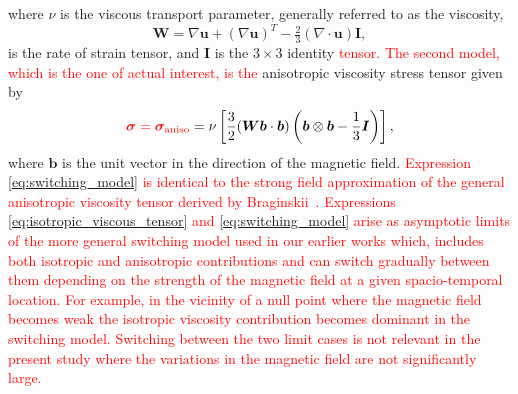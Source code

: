 \documentclass[12pt]{article}
\newcommand{\rs}[2]{\textcolor{red}{#2}}
\newcommand{\ten}[1]{{\bm #1}}
\renewcommand{\vec}[1]{{\bm #1}}
\begin{document}
where $\nu$ is the viscous transport parameter, generally referred to as the viscosity,
\begin{equation}
  \label{eq:rate_of_strain}
  \ten{W} = \nabla\vec{u} + (\nabla\vec{u})^T - \tfrac{2}{3}(\nabla \cdot \vec{u})\ten{I},
\end{equation}
is the rate of strain tensor, and $\ten{I}$ is the  $3\times 3$
identity \rs{}{tensor. The second model, which is the one of actual interest, is the} anisotropic viscosity stress
tensor given by
\begin{equation}
  \label{eq:switching_model}
\rs{}{\ten{\sigma} = \ten{\sigma}_\text{aniso}} = \nu \left[\frac{3}{2}(\ten{W}\vec{b}\cdot\vec{b}) \left( \vec{b} \otimes \vec{b} - \frac{1}{3}\ten{I} \right)\right],
\end{equation}
where $\vec{b}$ is the unit vector in the direction of the magnetic
field.
\rs{}{
Expression \eqref{eq:switching_model} is identical to the strong field approximation of the
general anisotropic viscosity tensor derived by Braginskii~\cite{braginskiiTransportProcessesPlasma1965}.
Expressions \eqref{eq:isotropic_viscous_tensor} and \eqref{eq:switching_model} arise as asymptotic limits of the
more general switching model used in our earlier works 
\cite{mactaggartBraginskiiMagnetohydrodynamicsArbitrary2017,quinnEffectAnisotropicViscosity2020,quinnKelvinHelmholtzInstabilityCollapse2021}
which, includes both isotropic and anisotropic contributions and can
switch gradually between them depending on the strength of the
magnetic field at a given spacio-temporal location. For example, in
the vicinity of a null point where the magnetic field becomes weak the
isotropic viscosity contribution becomes dominant in the switching
model. Switching between the two limit cases is not relevant in the
present study where the variations in the magnetic field are not
significantly large.}
\end{document}
